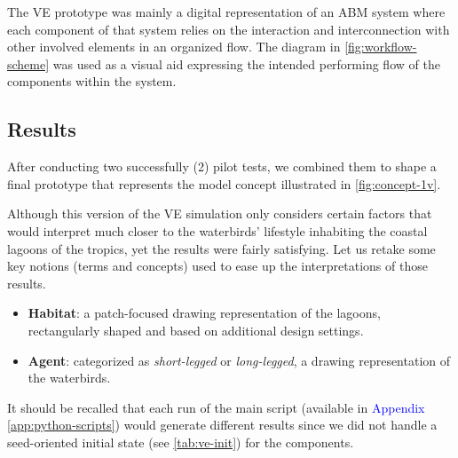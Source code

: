 The VE prototype was mainly a digital representation of an ABM system where each component of that system relies on the interaction and interconnection with other involved elements in an organized flow. The diagram in \autoref{fig:workflow-scheme} was used as a visual aid expressing the intended performing flow of the components within the system.

\subsection{Results}
After conducting two successfully (2) pilot tests, we combined them to shape a final prototype that represents the model concept illustrated in \autoref{fig:concept-1v}.

Although this version of the VE simulation only considers certain factors that would interpret much closer to the waterbirds' lifestyle inhabiting the coastal lagoons of the tropics, yet the results were fairly satisfying. Let us retake some key notions (terms and concepts) used to ease up the interpretations of those results.
\begin{itemize}
    \item \textbf{Habitat}: a patch-focused drawing representation of the lagoons, rectangularly shaped and based on additional design settings.
    \item \textbf{Agent}: categorized as \emph{short-legged} or \emph{long-legged}, a drawing representation of the waterbirds.
\end{itemize}

It should be recalled that each run of the main script (available in \textcolor{blue}{Appendix} \ref{app:python-scripts}) would generate different results since we did not handle a seed-oriented initial state (see \autoref{tab:ve-init}) for the components.

